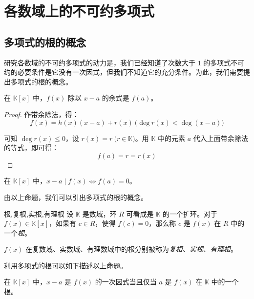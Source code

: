 
\section{各数域上的不可约多项式}

\subsection{多项式的根的概念}

研究各数域的不可约多项式的动力是，我们已经知道了次数大于 $1$ 的多项式不可约的必要条件是它没有一次因式，但我们不知道它的充分条件。为此，我们需要提出多项式的根的概念。

\begin{theorem}[余数定理]
	在 $\mathbb K[x]$ 中，$f(x)$ 除以 $x - a$ 的余式是 $f(a)$。
\end{theorem}

\begin{proof}
	作带余除法，得：
	$$
	f(x) = h(x) (x - a) + r(x) \pod{\deg r(x) < \deg (x - a)}
	$$

	可知 $\deg r(x) \le 0$，设 $r(x) = r \pod{r \in \mathbb K}$。用 $\mathbb K$ 中的元素 $a$ 代入上面带余除法的等式，即可得：
	$$
	f(a) = r = r(x)
	$$
\end{proof}

\begin{proposition}
	在 $\mathbb K[x]$ 中，$x - a \mid f(x) \Longleftrightarrow f(a) = 0$。
\end{proposition}

由以上命题，我们可以引出多项式的根的概念。

\begin{definition}{根,复根,实根,有理根}
	设 $\mathbb K$ 是数域，环 $R$ 可看成是 $\mathbb K$ 的一个扩环。对于 $f(x) \in \mathbb K[x]$，如果有 $c \in R$，使得 $f(c) = 0$，那么称 $c$ 是 $f(x)$ 在 $R$ 中的一个\emph{根}。

	$f(x)$ 在复数域、实数域、有理数域中的根分别被称为\emph{复根}、\emph{实根}、\emph{有理根}。
\end{definition}

利用多项式的根可以如下描述以上命题。

\begin{proposition}[裴蜀定理]
	在 $\mathbb K[x]$ 中，$x - a$ 是 $f(x)$ 的一次因式当且仅当 $a$ 是 $f(x)$ 在 $\mathbb K$ 中的一个根。
\end{proposition}

